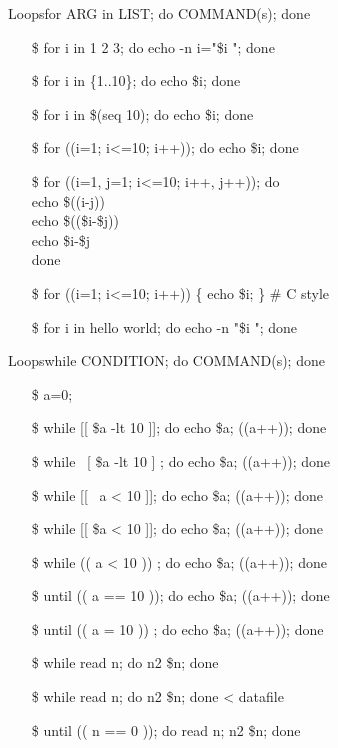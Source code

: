 \begin{frame}{Loops}{\ttfamily for ARG in LIST; do COMMAND(s); done}\small\ttfamily
\begin{itemize}
\item[\$] for i in 1 2 3; do echo -n i="\$i "; done
\item[\$] for i in \{1..10\}; do echo \$i; done
\item[\$] for i in \$(seq 10); do echo \$i; done
\item[\$] for ((i=1; i<=10; i++)); do echo \$i; done
\item[\$] for ((i=1, j=1; i<=10; i++, j++)); do\\
  \quad{}echo \$((i-j)) \Good\\
  \quad{}echo \$((\$i-\$j)) \Good\\
  \quad{}echo \$i-\$j \Bad\\
  done
\item[\$] for ((i=1; i<=10; i++)) \{ echo \$i; \} \# C style
\item[\$] for i in hello world; do echo -n "\$i "; done
\end{itemize}
\end{frame}

\begin{frame}{Loops}{\ttfamily while CONDITION; do COMMAND(s); done}\small\ttfamily
\begin{itemize}
\item[\$] a=0; 
\item[\$] while [[ \$a -lt 10 ]]; do echo \$a; ((a++)); done \correct
\item[\$] while \ [ \$a -lt 10 ] ; do echo \$a; ((a++)); done \correct
\item[\$] while [[ \ a < 10 ]]; do echo \$a; ((a++)); done \wrong
\item[\$] while [[ \$a < 10 ]]; do echo \$a; ((a++)); done \wrong
\item[\$] while (( a < 10 )) ; do echo \$a; ((a++)); done \correct
\item[\$] until (( a == 10 )); do echo \$a; ((a++)); done \correct
\item[\$] until (( a = 10 )) ; do echo \$a; ((a++)); done \Bad
\item[\$] while read n; do n2 \$n; done
\item[\$] while read n; do n2 \$n; done < datafile
\item[\$] until (( n == 0 )); do read n; n2 \$n; done
\end{itemize}
\end{frame}

